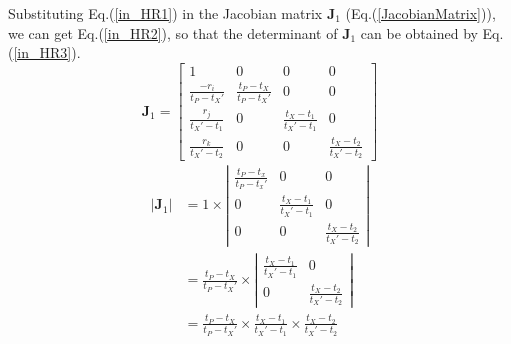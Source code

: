 \documentclass{bmcart}
\begin{document}
\begin{backmatter}
Substituting Eq.(\ref{in_HR1}) in the Jacobian matrix ${{\mathbf{J}}_1}$ (Eq.(\ref{JacobianMatrix})), we can get Eq.(\ref{in_HR2}), so that the determinant of ${{\mathbf{J}}_1}$ can be obtained by Eq.(\ref{in_HR3}).
\begin{equation}\label{in_HR2}
{{\mathbf{J}}_1} = \left[ {\begin{array}{*{20}{c}}
  1&0&0&0 \\ 
  {\frac{{ - {r_i}}}{{{t_P} - {t_X}'}}}&{\frac{{{t_P} - {t_X}}}{{{t_P} - {t_X}'}}}&0&0 \\ 
  {\frac{{{r_j}}}{{{t_X}' - {t_1}}}}&0&{\frac{{{t_X} - {t_1}}}{{{t_X}' - {t_1}}}}&0 \\ 
  {\frac{{{r_k}}}{{{t_X}' - {t_2}}}}&0&0&{\frac{{{t_X} - {t_2}}}{{{t_X}' - {t_2}}}} 
\end{array}} \right]
\end{equation}  
\begin{equation}\label{in_HR3}
\begin{aligned}
\left| {{{\mathbf{J}}_1}} \right| &= 1 \times \left| {\begin{array}{*{20}{c}}
  {\frac{{{t_P} - {t_x}}}{{{t_P} - {t_x}'}}}&0&0 \\ 
  0&{\frac{{{t_X} - {t_1}}}{{{t_X}' - {t_1}}}}&0 \\ 
  0&0&{\frac{{{t_X} - {t_2}}}{{{t_X}' - {t_2}}}} 
\end{array}} \right| \\&= \frac{{{t_P} - {t_X}}}{{{t_P} - {t_X}'}} \times \left| {\begin{array}{*{20}{c}}
  {\frac{{{t_X} - {t_1}}}{{{t_X}' - {t_1}}}}&0 \\ 
  0&{\frac{{{t_X} - {t_2}}}{{{t_X}' - {t_2}}}} 
\end{array}} \right| \\&= \frac{{{t_P} - {t_X}}}{{{t_P} - {t_X}'}} \times \frac{{{t_X} - {t_1}}}{{{t_X}' - {t_1}}} \times \frac{{{t_X} - {t_2}}}{{{t_X}' - {t_2}}}
\end{aligned}
\end{equation}  


\end{backmatter}
\end{document}
